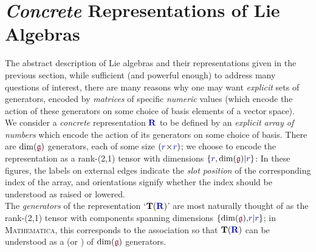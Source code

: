 \documentclass[12pt,a4paper]{article}\let\ifpdf\relax
\begin{document}
\newpage
\section{\emph{Concrete} Representations of Lie Algebras}\label{section:concrete_reps}\vspace{-4pt}

The abstract description of Lie algebras and their representations given in the previous section, while sufficient (and powerful enough) to address many questions of interest, there are many reasons why one may want \emph{explicit} sets of generators, encoded by \emph{matrices} of specific \emph{numeric} values (which encode the action of these generators on some choice of basis elements of a vector space).\\[-10pt]


We consider a \emph{concrete} representation $\mathbf{\b{R}}$ to be defined by an \emph{explicit array of numbers} which encode the action of its generators on some choice of basis. There are $\mathrm{dim}(\mathfrak{\r{g}})$ generators, each of some size $(\b{r}\!\times\!\b{r})$; we choose to encode the representation as a rank-(2,1) tensor with dimensions $\{\b{r},\mathrm{dim}(\mathfrak{\r{g}})|\b{r}\}$:
%
\vspace{-3pt}
%
In these figures, the labels on external edges indicate the \emph{slot position} of the corresponding index of the array, and orientations signify whether the index should be understood as raised or lowered.\\[-10pt] 


The \emph{generators} of the representation `$\mathbf{T}(\mathbf{\b{R}})$' are most naturally thought of as the rank-(2,1) tensor with components spanning dimensions $\{\mathrm{dim}(\mathfrak{\r{g}}),\!\b{r}|\b{r}\}$; in \textsc{Mathematica}, this corresponds to the association 
%
%
so that $\mathbf{T}(\mathbf{\b{R}})$ can be understood as a  (or ) of $\mathrm{dim}(\mathfrak{\r{g}})$ generators.\\[-10pt]
\end{document}
